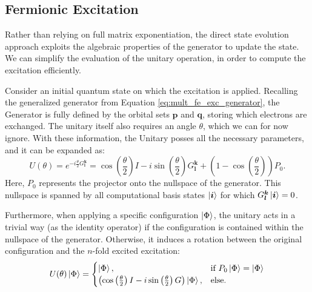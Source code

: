 \subsection{Fermionic Excitation}\label{subsec:fermionic-excitation}
Rather than relying on full matrix exponentiation, the direct state evolution approach exploits the algebraic properties of the generator to update the state.
We can simplify the evaluation of the unitary operation, in order to compute the excitation efficiently.

Consider an initial quantum state on which the excitation is applied.
Recalling the generalized generator from Equation \eqref{eq:mult_fe_exc_generator}, the Generator is fully defined by the orbital sets $\boldsymbol{p}$ and $\boldsymbol{q}$, storing which electrons are exchanged.
The unitary itself also requires an angle $\theta$, which we can for now ignore.
With these information, the Unitary posses all the necessary parameters, and it can be expanded as:
\begin{equation} \label{eq:fermionic-excitation-term}
    U(\theta) = e^{-i\frac{\theta}{2}G^{\boldsymbol{k}}_{\boldsymbol{l}}} = \cos\left(\frac{\theta}{2}\right) I - i\sin\left(\frac{\theta}{2}\right)G^{\boldsymbol{k}}_{\boldsymbol{l}} + \left(1 - \cos\left(\frac{\theta}{2}\right)\right) P_0.
\end{equation}
Here, $P_0$ represents the projector onto the nullspace of the generator.
This nullspace is spanned by all computational basis states $\ket{\boldsymbol{i}}$ for which $G^{\boldsymbol{k}}_{\boldsymbol{l}} \ket{\boldsymbol{i}} = 0$.

Furthermore, when applying a specific configuration $\ket{\Phi}$, the unitary acts in a trivial way (as the identity operator) if the configuration is contained within the nullspace of the generator.
Otherwise, it induces a rotation between the original configuration and the $n$-fold excited excitation:
\begin{equation} \label{eq:qubit-excitation-unitary-transformation-configuration-differences}
    U(\theta) \ket{\Phi} = \begin{cases} \ket{\Phi}, & \text{if } P_0\ket{\Phi} = \ket{\Phi} \\ \left(\cos\left(\frac{\theta}{2}\right) I - i\sin\left(\frac{\theta}{2}\right)G\right)\ket{\Phi}, & \text{else.} \end{cases}
\end{equation}
\cite[chapter II.A]{kottmann2020feasible}

